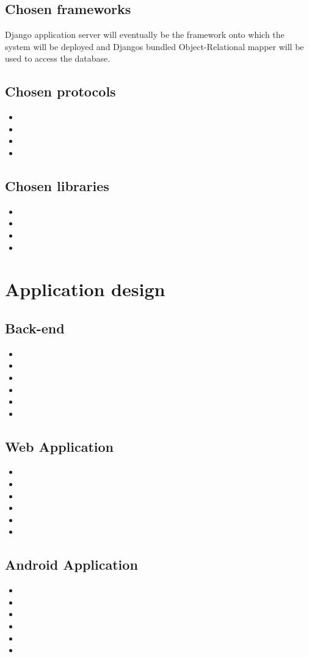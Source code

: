 \documentclass[12pt,a4paper]{article}
\begin{document}
\subsection{Chosen frameworks}
Django application server will eventually be the framework onto which the system will be deployed and Djangos bundled Object-Relational mapper will be used to access the database.
\subsection{Chosen protocols}
\begin{itemize}
\item
\item 
\item 
\item
\end{itemize}
\subsection{Chosen libraries}
\begin{itemize}
\item
\item 
\item 
\item
\end{itemize}

\section{Application design}
\subsection{Back-end}
\begin{itemize}
\item
\item
\item
\item
\item
\item
\end{itemize}
\subsection{Web Application}
\begin{itemize}
\item
\item
\item
\item
\item
\item
\end{itemize}
\subsection{Android Application}
\begin{itemize}
\item
\item
\item
\item
\item
\item
\end{itemize}
\end{document}
